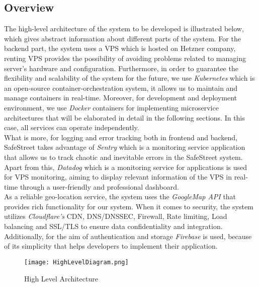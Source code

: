 \subsection{Overview}
The high-level architecture of the system to be developed is illustrated below, which gives abstract information about different parts of the system. For the backend part, the system uses a VPS which is hosted on Hetzner company, renting VPS provides the possibility of avoiding problems related to managing server’s hardware and configuration. Furthermore, in order to guarantee the flexibility and scalability of the system for the future, we use \emph{Kubernetes} which is an open-source container-orchestration system, it allows us to maintain and manage containers in real-time. Moreover, for development and deployment environment, we use \emph{Docker} containers  for implementing microservice architectures that will be elaborated in detail in the following sections. In this case, all services can operate independently. \\
What is more, for logging and error tracking both in frontend and backend, SafeStreet takes advantage of \emph{Sentry} which is a monitoring service application that allows us to track chaotic and inevitable errors in the SafeStreet system. Apart from this, \emph{Datadog} which is a monitoring service for applications is used for VPS monitoring, aiming to display relevant information of the VPS in real-time through a user-friendly and professional dashboard. \\
As a reliable geo-location service, the system uses the \emph{GoogleMap API} that provides rich functionality for our system. When it comes to security, the system utilizes \emph{Cloudflare’s} CDN, DNS/DNSSEC, Firewall, Rate limiting, Load balancing and SSL/TLS to ensure data confidentiality and integration. Additionally, for the aim of authentication and storage \emph{Firebase} is used, because of its simplicity that helps developers to implement their application. 


\begin{figure}[H]
\caption{High Level Architecture}
\label{fig:HighLevel}
\centering
\texttt{[image: HighLevelDiagram.png]}
\end{figure}
